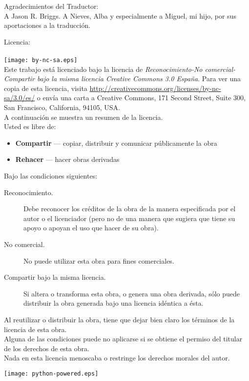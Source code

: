 \noindent
Agradecimientos del Traductor:\\
A Jason R. Briggs. A Nieves, Alba y especialmente a Miguel, mi hijo, por sus aportaciones a la traducción.

\noindent
Licencia:\\
\\
\texttt{[image: by-nc-sa.eps]}\\
Este trabajo está licenciado bajo la licencia de \emph{Reconocimiento-No comercial-Compartir bajo la misma licencia Creative Commons 3.0 España}. Para ver una copia de esta licencia, visita \href{http://creativecommons.org/licenses/by-nc-sa/3.0/es/}{http://creativecommons.org/licenses/by-nc-sa/3.0/es/} o envía una carta a Creative Commons, 171 Second Street, Suite 300, San Francisco, California, 94105, USA.\\

\noindent
A continuación se muestra un resumen de la licencia.\\

\noindent
Usted es libre de:
\begin{itemize}
 \item \textbf{Compartir} — copiar, distribuir y comunicar públicamente la obra 
 \item \textbf{Rehacer} — hacer obras derivadas
\end{itemize}
\noindent
Bajo las condiciones siguientes:
\begin{description}
 \item[Reconocimiento.] Debe reconocer los créditos de la obra de la manera especificada por el autor o el licenciador (pero no de una manera que sugiera que tiene su apoyo o apoyan el uso que hacer de su obra).
 \item[No comercial.] No puede utilizar esta obra para fines comerciales.
 \item[Compartir bajo la misma licencia.] Si altera o transforma esta obra, o genera una obra derivada, sólo puede distribuir la obra generada bajo una licencia idéntica a ésta. 
\end{description}

\noindent
Al reutilizar o distribuir la obra, tiene que dejar bien claro los términos de la licencia de esta obra.\\

\noindent
Alguna de las condiciones puede no aplicarse si se obtiene el permiso del titular de los derechos de esta obra.\\

\noindent
Nada en esta licencia menoscaba o restringe los derechos morales del autor.\\

\vspace*{4cm}
\begin{center}
\texttt{[image: python-powered.eps]}
\end{center}

\mainmatter

\pagestyle{plain}

\tableofcontents
